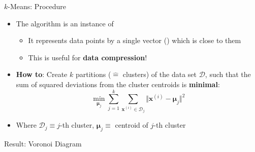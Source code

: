 \begin{frame}{$k$-Means: Procedure}{}\important
	\begin{itemize}
		\item The algorithm is an instance of 
		\begin{itemize}
			\item It represents data points by a single vector () which is close to them
			\item This is useful for \textbf{data compression}!
		\end{itemize}
		\item \textbf{How to}: Create $k$ partitions ($\widehat{=}$ clusters) of the data set $\mathcal{D}$, such that
			the sum of squared deviations from the cluster centroids is \textbf{minimal}:
		\begin{equation}
			\min_{\bm{\mu}_j} \sum_{j=1}^k \sum_{\bm{x}^{(i)} \in \mathcal{D}_j} \Vert \bm{x}^{(i)} - \bm{\mu}_j \Vert^2
		\end{equation}
		\item Where $\mathcal{D}_j \equiv j$-th cluster, $\bm{\mu}_j \equiv$ centroid of $j$-th cluster
	\end{itemize}
\end{frame}


\begin{frame}{Result: Voronoi Diagram}{}\important
\end{frame}


